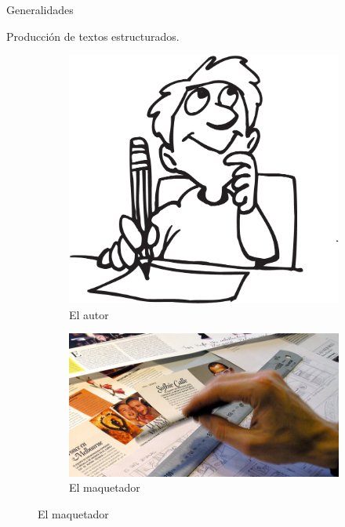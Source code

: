 \documentclass[10pt]{beamer}
\begin{document}
\begin{frame}{Generalidades}
	\begin{block}{Producción de textos estructurados.}
	\vspace{-.4cm}
	\begin{multicols}{2}
		\begin{figure}
			\centering
			\begin{subfigure}[b]{0.5\textwidth} 
				\centering
				\includegraphics[scale=.04]{figures/autor}
				\caption{El autor}			
			\end{subfigure}
			
			\vspace*{.25cm}			
			
			\begin{subfigure}[b]{0.5\textwidth} 
				\centering
				\includegraphics[scale=.08]{figures/maquetador}
				\caption{El maquetador}
			\end{subfigure}
			

\end{figure}
\end{multicols}
\end{block}
\end{frame}
\end{document}
